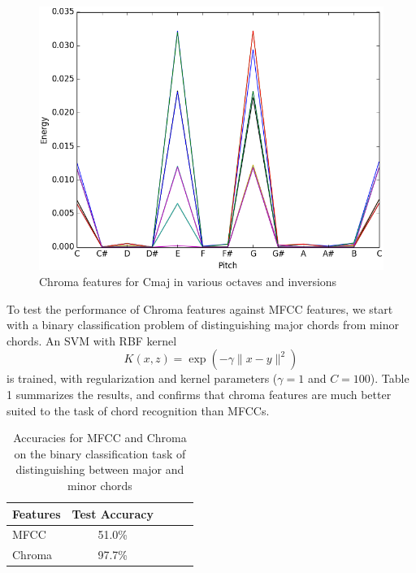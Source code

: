 \documentclass{article}
\begin{document}
\begin{figure}[ht]
\vskip 0.2in
\begin{center}
\centerline{\includegraphics[width=\columnwidth]{chromac}}
\caption{Chroma features for Cmaj in various octaves and inversions}
\label{chroma}
\end{center}
\vskip -0.2in
\end{figure}

To test the performance of Chroma features against MFCC features, we start with
a binary classification problem of distinguishing major chords from minor
chords. An SVM with RBF kernel $$ K(x, z) = \exp(-\gamma\lVert{x - y}\rVert^2)$$
is trained, with regularization and kernel parameters ($\gamma = 1$ and $C =
100$). Table 1 summarizes the results, and confirms that chroma features are
much better suited to the task of chord recognition than MFCCs.

\begin{table}[t]
\caption{Accuracies for MFCC and Chroma on the binary classification task of
distinguishing between major and minor chords}
\label{mfccvschroma}
\vskip 0.15in
\begin{center}
\begin{small}
\begin{sc}
\begin{tabular}{lcccr}
\hline
\abovespace\belowspace
Features & Test Accuracy \\
\hline
\abovespace
MFCC & 51.0\%\\
Chroma & 97.7\%\\
\hline
\end{tabular}
\end{sc}
\end{small}
\end{center}
\vskip -0.1in
\end{table}
\end{document}
